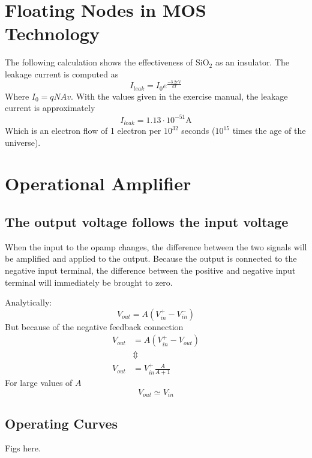 


\newpage
\section{Floating Nodes in MOS Technology}
The following calculation shows the effectiveness of \(\mathrm{SiO}_2\) as an insulator. The leakage current is computed as
\begin{equation*}
    I_{leak} = I_0e^{\frac{-3.2 \mathrm{eV}}{kT}}
\end{equation*}
Where \(I_0 = qNAv\). With the values given in the exercise manual, the leakage current is approximately
\begin{equation*}
    I_{leak} = 1.13 \cdot 10^{-51} \mathrm{A}
\end{equation*}
Which is an electron flow of 1 electron per \(10^{32}\) seconds (\(10^{15}\) times the age of the universe).

\section{Operational Amplifier}
\subsection{The output voltage follows the input voltage}
When the input to the opamp changes, the difference between the two signals will be amplified and applied to the output.
Because the output is connected to the negative input terminal, the difference between the positive and negative input terminal
will immediately be brought to zero.

Analytically:
\begin{equation*}
    V_{out} = A(V_{in}^+ - V_{in}^-)
\end{equation*}
But because of the negative feedback connection
\begin{align*}
    V_{out} &= A(V_{in}^+ - V_{out}) \\
            &\Updownarrow \\
    V_{out} &= V_{in}^+ \frac{A}{A+1}
\end{align*}
For large values of \(A\)
\begin{equation*}
    V_{out} \simeq V_{in}
\end{equation*}

\subsection{Operating Curves}
Figs here.

